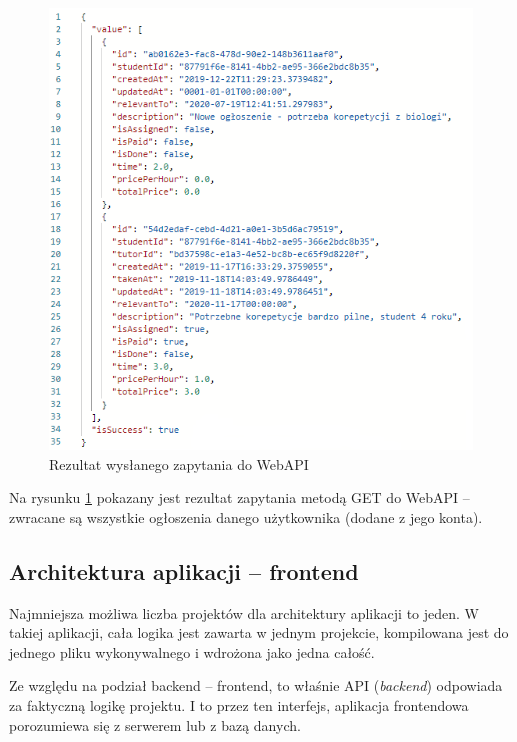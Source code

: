 \documentclass[12pt]{article}
\numberwithin{figure}{section}
\begin{document}
\begin{sloppypar}
        \begin{figure}[H] 
         	\centering
        	\includegraphics[width=.9\textwidth]{images/chapter_3/json-get.png}
        	\caption{Rezultat wysłanego zapytania do WebAPI}
        	\label{fig:json-get}
        \end{figure}
        
        Na rysunku \ref{fig:json-get} pokazany jest rezultat zapytania metodą GET do WebAPI -- zwracane są wszystkie ogłoszenia danego użytkownika (dodane z jego konta).
        
\clearpage
\subsection{Architektura aplikacji -- frontend}
Najmniejsza możliwa liczba projektów dla architektury aplikacji to jeden. W takiej aplikacji, cała logika jest zawarta w jednym projekcie, kompilowana jest do jednego pliku wykonywalnego i wdrożona jako jedna całość. 
    
Ze względu na podział backend -- frontend, to właśnie API (\textit{backend}) odpowiada za faktyczną logikę projektu. I to przez ten interfejs, aplikacja frontendowa porozumiewa się z serwerem lub z bazą danych. 
    

\end{sloppypar}
\end{document}
